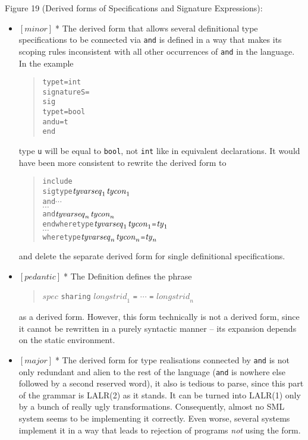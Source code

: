 \documentclass{article}
\newcommand{\m}[1]{$[\mathit{#1}]\;$}
\newcommand{\major}{\m{major}}
\newcommand{\minor}{\m{minor}}
\newcommand{\pedantic}{\m{pedantic}}
\begin{document}
Figure 19 (Derived forms of Specifications and Signature Expressions):
\nopagebreak

\begin{itemize}
\item \minor * The derived form that allows several definitional type specifications to be connected via {\tt and} is defined in a way that makes its scoping rules inconsistent with all other occurrences of {\tt and} in the language. In the example
\begin{quote}
\begin{alltt}
type t = int
signature S =
sig
    type t = bool
    and  u = t
end
\end{alltt}
\end{quote}
type {\tt u} will be equal to {\tt bool}, not {\tt int} like in equivalent declarations. It would have been more consistent to rewrite the derived form to
\begin{quote}
\begin{alltt}
include
  sig type \(\mathit{tyvarseq}\sb{1}\) \(\mathit{tycon}\sb{1}\)
       and \(\cdots\)
       \(\cdots\)
       and \(\mathit{tyvarseq}\sb{n}\) \(\mathit{tycon}\sb{n}\)
  end where type \(\mathit{tyvarseq}\sb{1}\) \(\mathit{tycon}\sb{1}\) = \(\mathit{ty}\sb{1}\)
      \(\cdots\)
      where type \(\mathit{tyvarseq}\sb{n}\) \(\mathit{tycon}\sb{n}\) = \(\mathit{ty}\sb{n}\)
\end{alltt}
\end{quote}
and delete the separate derived form for single definitional specifications.

\item \pedantic * The Definition defines the phrase
\begin{quote}
$\mathit{spec}$ {\tt sharing} $\mathit{longstrid}_1$ {\tt =} $\cdots$ {\tt =} $\mathit{longstrid}_n$
\end{quote}
as a derived form. However, this form technically is not a derived form, since it cannot be rewritten in a purely syntactic manner -- its expansion depends on the static environment.

\item \major * The derived form for type realisations connected by {\tt and} is not only redundant and alien to the rest of the language ({\tt and} is nowhere else followed by a second reserved word), it also is tedious to parse, since this part of the grammar is LALR(2) as it stands. It can be turned into LALR(1) only by a bunch of really ugly transformations. Consequently, almost no SML system seems to be implementing it correctly. Even worse, several systems implement it in a way that leads to rejection of programs {\em not} using the form.
\end{itemize}
\end{document}
